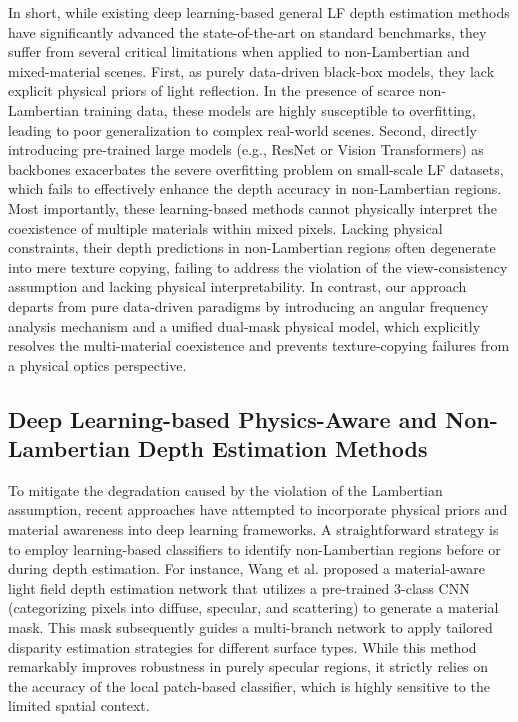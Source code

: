 \documentclass[lettersize,journal]{IEEEtran}
\begin{document}
In short, while existing deep learning-based general LF depth estimation methods have significantly advanced the state-of-the-art on standard benchmarks, they suffer from several critical limitations when applied to non-Lambertian and mixed-material scenes. First, as purely data-driven black-box models, they lack explicit physical priors of light reflection. In the presence of scarce non-Lambertian training data, these models are highly susceptible to overfitting, leading to poor generalization to complex real-world scenes. Second, directly introducing pre-trained large models (e.g., ResNet or Vision Transformers) as backbones exacerbates the severe overfitting problem on small-scale LF datasets, which fails to effectively enhance the depth accuracy in non-Lambertian regions. Most importantly, these learning-based methods cannot physically interpret the coexistence of multiple materials within mixed pixels. Lacking physical constraints, their depth predictions in non-Lambertian regions often degenerate into mere texture copying, failing to address the violation of the view-consistency assumption and lacking physical interpretability. In contrast, our approach departs from pure data-driven paradigms by introducing an angular frequency analysis mechanism and a unified dual-mask physical model, which explicitly resolves the multi-material coexistence and prevents texture-copying failures from a physical optics perspective.

\subsection{Deep Learning-based Physics-Aware and Non-Lambertian Depth Estimation Methods}

To mitigate the degradation caused by the violation of the Lambertian assumption, recent approaches have attempted to incorporate physical priors and material awareness into deep learning frameworks. A straightforward strategy is to employ learning-based classifiers to identify non-Lambertian regions before or during depth estimation. For instance, Wang et al. \cite{materialawarelightfieldspe} proposed a material-aware light field depth estimation network that utilizes a pre-trained 3-class CNN (categorizing pixels into diffuse, specular, and scattering) to generate a material mask. This mask subsequently guides a multi-branch network to apply tailored disparity estimation strategies for different surface types. While this method remarkably improves robustness in purely specular regions, it strictly relies on the accuracy of the local patch-based classifier, which is highly sensitive to the limited spatial context.
\end{document}
